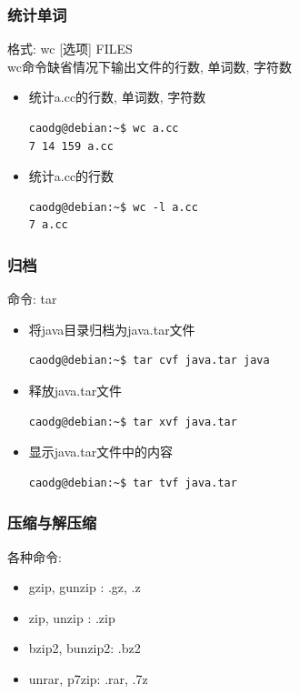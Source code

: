 \documentclass[compress]{beamer}
\begin{document}
\begin{frame}[containsverbatim]
\frametitle{统计单词}

格式: \alert{wc} [选项] FILES \\
\alert{wc}命令缺省情况下输出文件的行数, 单词数, 字符数

\begin{itemize}
\item 统计a.cc的行数, 单词数, 字符数\\[1ex]
\begin{Verbatim}
caodg@debian:~$ wc a.cc
7 14 159 a.cc
\end{Verbatim}

\item 统计a.cc的行数\\[1ex]
\begin{Verbatim}
caodg@debian:~$ wc -l a.cc
7 a.cc
\end{Verbatim}

\end{itemize}

\end{frame}

\begin{frame}[containsverbatim]
  \frametitle{归档}
命令: \alert{tar}

\begin{itemize}
\item 将java目录归档为java.tar文件\\
\begin{Verbatim}
caodg@debian:~$ tar cvf java.tar java
\end{Verbatim}

\item 释放java.tar文件\\
\begin{Verbatim}
caodg@debian:~$ tar xvf java.tar
\end{Verbatim}

\item 显示java.tar文件中的内容\\
\begin{Verbatim}
caodg@debian:~$ tar tvf java.tar
\end{Verbatim}

\end{itemize}

\end{frame}


\begin{frame}
\frametitle{压缩与解压缩}
各种命令: 
\begin{itemize}
  \item \alert{gzip}, \alert{gunzip} : .gz, .z
  \item \alert{zip}, \alert{unzip} : .zip 
  \item \alert{bzip2}, \alert{bunzip2}: .bz2
  \item \alert{unrar}, \alert{p7zip}: .rar, .7z
\end{itemize}


\end{frame}
\end{document}

